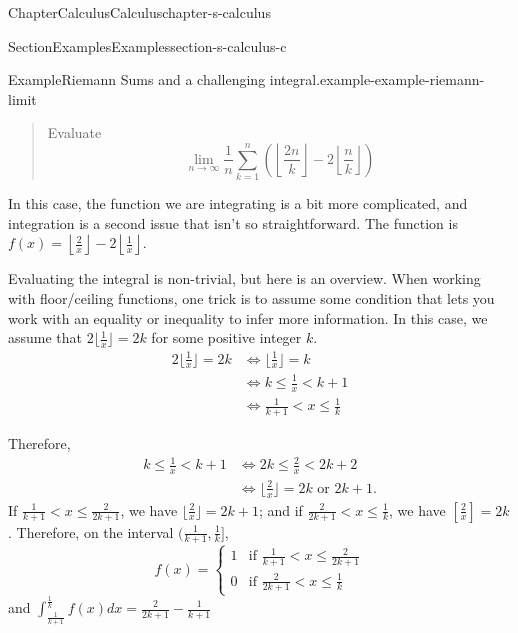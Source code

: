 \documentclass[oneside,10pt,]{book}
\numberwithin{equation}{section}
\newcommand{\lt}{<}
\begin{document}
\begin{chapterptx}{Chapter}{Calculus}{}{Calculus}{}{}{chapter-s-calculus}
\begin{sectionptx}{Section}{Examples}{}{Examples}{}{}{section-s-calculus-c}
\begin{example}{Example}{Riemann Sums and a challenging integral.}{example-example-riemann-limit}
\begin{quote}%
Evaluate%
\begin{equation*}
\lim_{n\to\infty} \frac{1}{n} \sum _{k=1}^n \left(\left\lfloor
\frac{2 n}{k}\right\rfloor -2
\left\lfloor
\frac{n}{k}\right\rfloor \right) 
\end{equation*}
%
\end{quote}
In this case, the function we are integrating is a bit more complicated, and integration is a second issue that isn't so straightforward.  The function is \(f(x)= \left\lfloor \frac{2}{x}\right\rfloor - 2 \left\lfloor \frac{1}{x}\right\rfloor\).%
\par
Evaluating the integral is non-trivial, but here is an overview.  When working with floor\slash{}ceiling functions, one trick  is to assume some condition that lets you work with an equality or inequality to infer more information.  In this case, we assume that  \(2\lfloor \frac{1}{x}\rfloor =2k\) for some positive integer \(k\).%
\begin{equation*}
\begin{split}
2\lfloor \frac{1}{x}\rfloor =2k &\Leftrightarrow  \lfloor \frac{1}{x}\rfloor=k\\
& \Leftrightarrow k \leq \frac{1}{x} \lt k +1 \\
& \Leftrightarrow \frac{1}{k+1} \lt x \leq \frac{1}{k}
\end{split}
\end{equation*}
%
\par
Therefore,%
\begin{equation*}
\begin{split}
k \leq \frac{1}{x} \lt k +1  &\Leftrightarrow 2k \leq \frac{2}{x} \lt 2k +2 \\
&\Leftrightarrow  \lfloor \frac{2}{x} \rfloor = 2k \textrm{ or } 2k + 1.
\end{split}
\end{equation*}
If \(\frac{1}{k+1} \lt x \leq \frac{2}{2k+1}\), we have \(\lfloor \frac{2}{x}\rfloor = 2k+1\); and if \(\frac{2}{2k+1} \lt x \leq \frac{1}{k}\), we have \([\frac{2}{x}] = 2k\).  Therefore,  on the interval \((\frac{1}{k+1}, \frac{1}{k}]\),%
\begin{equation*}
f(x)=\begin{cases} 1 & \textrm{if } \frac{1}{k+1} \lt x \leq \frac{2}{2k+1}\\
0 & \textrm{if } \frac{2}{2k+1} \lt x \leq \frac{1}{k}
\end{cases}
\end{equation*}
and \(\int_{\frac{1}{k+1}}^{\frac{1}{k}} f(x) dx = \frac{2}{2k+1}-  \frac{1}{k+1}\)%

\end{example}
\end{sectionptx}
\end{chapterptx}
\end{document}

